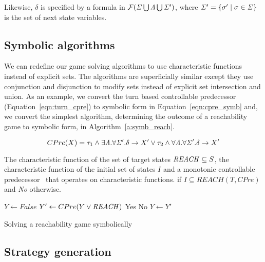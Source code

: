 Likewise, $\delta$ is specified by a formula in $\mathcal{F}(\mathit{\Sigma} \bigcup \mathit{\Lambda} \bigcup \mathit{\Sigma}')$, where $\mathit{\Sigma}' = \{\sigma' \mid \sigma \in \mathit{\Sigma} \}$ is the set of next state variables.

\subsection{Symbolic algorithms}

We can redefine our game solving algorithms to use characteristic functions instead of explicit sets. The algorithms are superficially similar except they use conjunction and disjunction to modify sets instead of explicit set intersection and union. As an example, we convert the turn based controllable predecessor (Equation~\ref{eqn:turn_cpre}) to symbolic form in Equation~\ref{eqn:cpre_symb} and, we convert the simplest algorithm, determining the outcome of a reachability game to symbolic form, in Algorithm~\ref{a:symb_reach}.

\begin{equation}
CPre(X) = \tau_1 \wedge \exists \mathit{\Lambda}. \forall \mathit{\Sigma}'. \delta \rightarrow X' \vee \tau_2 \wedge \forall \mathit{\Lambda}. \forall \mathit{\Sigma}'. \delta \rightarrow X' 
\label{eqn:cpre_symb}
\end{equation}

\begin{algorithm}
\begin{algorithmic}

\Require The characteristic function of the set of target states $\mathit{REACH} \subseteq S$, the characteristic function of the initial set of states $I$ and a monotonic controllable predecessor \cpre\ that operates on characteristic functions.
 if $I \subseteq REACH(T, CPre)$ and {\it No} otherwise.

    \State $Y \gets False$
    \Loop
        \State $Y' \gets CPre(Y \vee \mathit{REACH})$
                \State\Return Yes
            \Else
                \State\Return No
            \EndIf
        \EndIf
        \State $Y \gets Y'$
    \EndLoop
\EndFunction

\end{algorithmic}
\caption{Solving a reachability game symbolically}
\label{a:symb_reach}
\end{algorithm}

\subsection{Strategy generation}

